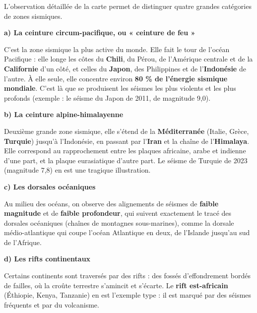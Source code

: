 \documentclass[11pt]{article}
\newcommand{\cle}[1]{{\popxbold\color{popdark}#1}}
\begin{document}
L'observation détaillée de la carte permet de distinguer quatre grandes catégories de zones sismiques.

\textbf{a) La ceinture circum-pacifique, ou « ceinture de feu »}

C'est la zone sismique la plus active du monde. Elle fait le tour de l'océan Pacifique : elle longe les côtes du \textbf{Chili}, du Pérou, de l'Amérique centrale et de la \textbf{Californie} d'un côté, et celles du \textbf{Japon}, des Philippines et de l'\textbf{Indonésie} de l'autre. À elle seule, elle concentre environ \textbf{80 \% de l'énergie sismique mondiale}. C'est là que se produisent les séismes les plus violents et les plus profonds (exemple : le séisme du Japon de 2011, de magnitude 9,0).

\textbf{b) La ceinture alpine-himalayenne}

Deuxième grande zone sismique, elle s'étend de la \textbf{Méditerranée} (Italie, Grèce, \textbf{Turquie}) jusqu'à l'Indonésie, en passant par l'\textbf{Iran} et la chaîne de l'\textbf{Himalaya}. Elle correspond au rapprochement entre les plaques africaine, arabe et indienne d'une part, et la plaque eurasiatique d'autre part. Le séisme de Turquie de 2023 (magnitude 7,8) en est une tragique illustration.

\textbf{c) Les dorsales océaniques}

Au milieu des océans, on observe des alignements de séismes de \textbf{faible magnitude} et de \textbf{faible profondeur}, qui suivent exactement le tracé des \cle{dorsales océaniques} (chaînes de montagnes sous-marines), comme la dorsale médio-atlantique qui coupe l'océan Atlantique en deux, de l'Islande jusqu'au sud de l'Afrique.

\textbf{d) Les rifts continentaux}

Certains continents sont traversés par des \cle{rifts} : des fossés d'effondrement bordés de failles, où la croûte terrestre s'amincit et s'écarte. Le \textbf{rift est-africain} (Éthiopie, Kenya, Tanzanie) en est l'exemple type : il est marqué par des séismes fréquents et par du volcanisme.
\end{document}
